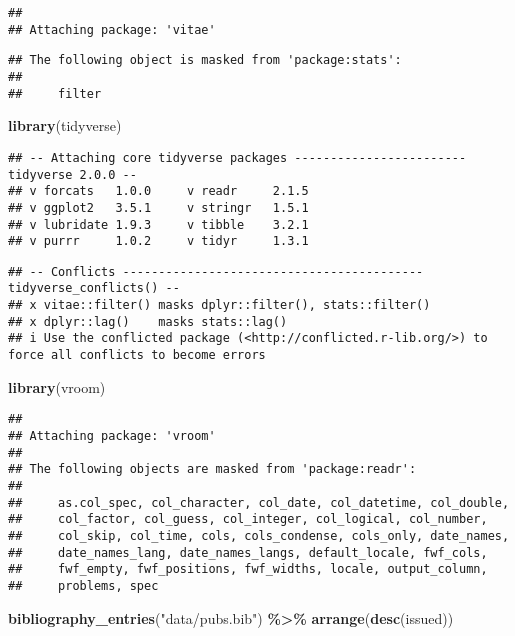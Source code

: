 \documentclass[11pt,a4paper,]{awesome-cv}
\newenvironment{Shaded}{\begin{snugshade}}{\end{snugshade}}
\newcommand{\FunctionTok}[1]{\textcolor[rgb]{0.13,0.29,0.53}{\textbf{#1}}}
\newcommand{\NormalTok}[1]{#1}
\newcommand{\SpecialCharTok}[1]{\textcolor[rgb]{0.81,0.36,0.00}{\textbf{#1}}}
\newcommand{\StringTok}[1]{\textcolor[rgb]{0.31,0.60,0.02}{#1}}
\begin{document}
\begin{verbatim}
## 
## Attaching package: 'vitae'
\end{verbatim}

\begin{verbatim}
## The following object is masked from 'package:stats':
## 
##     filter
\end{verbatim}

\begin{Shaded}
\begin{Highlighting}[]
\FunctionTok{library}\NormalTok{(tidyverse)}
\end{Highlighting}
\end{Shaded}

\begin{verbatim}
## -- Attaching core tidyverse packages ------------------------ tidyverse 2.0.0 --
## v forcats   1.0.0     v readr     2.1.5
## v ggplot2   3.5.1     v stringr   1.5.1
## v lubridate 1.9.3     v tibble    3.2.1
## v purrr     1.0.2     v tidyr     1.3.1
\end{verbatim}

\begin{verbatim}
## -- Conflicts ------------------------------------------ tidyverse_conflicts() --
## x vitae::filter() masks dplyr::filter(), stats::filter()
## x dplyr::lag()    masks stats::lag()
## i Use the conflicted package (<http://conflicted.r-lib.org/>) to force all conflicts to become errors
\end{verbatim}

\begin{Shaded}
\begin{Highlighting}[]
\FunctionTok{library}\NormalTok{(vroom)}
\end{Highlighting}
\end{Shaded}

\begin{verbatim}
## 
## Attaching package: 'vroom'
## 
## The following objects are masked from 'package:readr':
## 
##     as.col_spec, col_character, col_date, col_datetime, col_double,
##     col_factor, col_guess, col_integer, col_logical, col_number,
##     col_skip, col_time, cols, cols_condense, cols_only, date_names,
##     date_names_lang, date_names_langs, default_locale, fwf_cols,
##     fwf_empty, fwf_positions, fwf_widths, locale, output_column,
##     problems, spec
\end{verbatim}

\begin{Shaded}
\begin{Highlighting}[]
\FunctionTok{bibliography\_entries}\NormalTok{(}\StringTok{"data/pubs.bib"}\NormalTok{) }\SpecialCharTok{\%\textgreater{}\%}
    \FunctionTok{arrange}\NormalTok{(}\FunctionTok{desc}\NormalTok{(issued))}
\end{Highlighting}
\end{Shaded}
\end{document}
